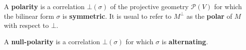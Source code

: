 A \textbf{polarity} is a correlation $\bot(\sigma)$ of the projective geometry $\mathcal{P}(V)$ for which the bilinear form $\sigma$ is \textbf{symmetric}. It is usual to refer to $M^\perp$ as the \textbf{polar} of $M$ with respect to $\bot$.

A \textbf{null-polarity} is a correlation $\bot(\sigma)$ for which $\sigma$ is \textbf{alternating}.
